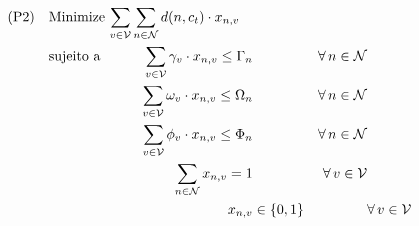 \documentclass[12pt, a4paper]{article}
\theoremstyle{definition}
\newcommand\CPU{\Omega}
\newcommand\MEMORY{\Phi}
\newcommand\STORAGE{\Gamma}
\newcommand\cpu{\omega}
\newcommand\memory{\phi}
\newcommand\storage{\gamma}
\newcommand\threshold{\tau}
\begin{document}
\begin{alignat}{4}
\mathrm{(P2)} \quad & \omit\rlap{Minimize $\displaystyle \sum_{v \in \mathcal{V}} \sum_{n \in \mathcal{N}} d(n,c_t) \cdot x_{n, v}$}\nonumber\\
                   & \mbox{sujeito a} && \quad & \sum_{v \in \mathcal{V}} \storage_v \cdot x_{n, v} \leq \STORAGE_{n}      &\qquad & \forall\, n \in \mathcal{N} \label{pl:C11}\\
                   &                  && \quad & \sum_{v \in \mathcal{V}} \cpu_v \cdot x_{n, v} \leq \CPU_{n}      &\qquad & \forall\, n \in \mathcal{N} \label{pl:C12}\\
                   &                  && \quad & \sum_{v \in \mathcal{V}} \memory_v \cdot x_{n, v} \leq \MEMORY_{n}      &\qquad & \forall\, n \in \mathcal{N} \label{pl:C13}\\
                   &                  && \quad & \sum_{n \in \mathcal{N}} x_{n, v} = 1    &\qquad & \forall\, v \in \mathcal{V} \label{pl:C13}\\
                   &                  &&       &  x_{n,v}                           & \in \{0,1\} &       & \forall\, v \in \mathcal{V}\nonumber
\end{alignat}
\end{document}
